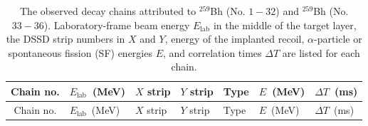 \documentclass[amsmath, amssymb, aps, prl, reprint, superscriptaddress]{revtex4-2}
\begin{document}
\setlength{\tabcolsep}{8pt}
\setlength{\LTcapwidth}{0.8\textwidth}
\begin{longtable*}{cllllll}
\caption{The observed decay chains attributed to $^{259}$Bh (No. $1-32$) and  $^{259}$Bh (No. $33-36$). Laboratory-frame beam energy $E_{\textrm{lab}}$ in the middle of the target layer, the DSSD strip numbers in $X$ and $Y$, energy of the implanted recoil, $\alpha$-particle or spontaneous fission (SF) energies $E$, and correlation times $\Delta T$ are listed for each chain.} 
\label{table1} \\
\hline
Chain no.& $E_{\textrm{lab}}$~(MeV) & $X$ strip & $Y$ strip & Type & $E$~(MeV)& $\Delta T$~(ms) \\
\hline
\endfirsthead

\hline
Chain no.& $E_{\textrm{lab}}$~(MeV) & $X$ strip & $Y$ strip & Type & $E$~(MeV)& $\Delta T$~(ms) \\
\hline
\endhead



\end{longtable*}
\end{document}
